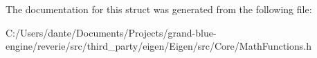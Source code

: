 The documentation for this struct was generated from the following file\+:\begin{DoxyCompactItemize}
\item 
C\+:/\+Users/dante/\+Documents/\+Projects/grand-\/blue-\/engine/reverie/src/third\+\_\+party/eigen/\+Eigen/src/\+Core/Math\+Functions.\+h\end{DoxyCompactItemize}

